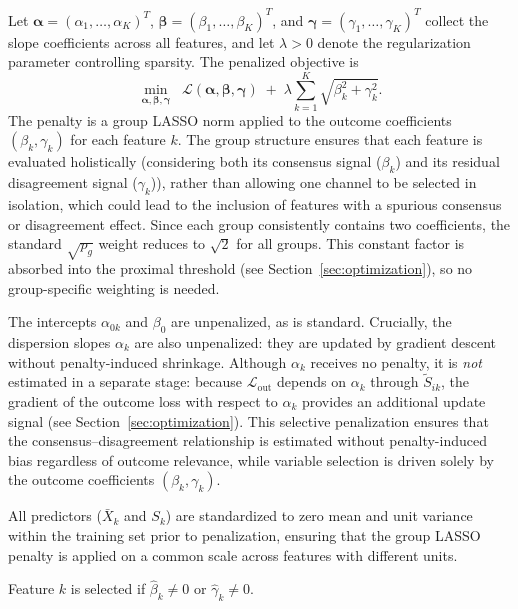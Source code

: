 \documentclass[referee,lineno,pdflatex,sn-vancouver-num]{sn-jnl}
\begin{document}
Let $\boldsymbol{\alpha} = (\alpha_1,\dots,\alpha_K)^T$, $\boldsymbol{\beta} = (\beta_1,\dots,\beta_K)^T$, and $\boldsymbol{\gamma} = (\gamma_1,\dots,\gamma_K)^T$ collect the slope coefficients across all features, and let $\lambda > 0$ denote the regularization parameter controlling sparsity.
The penalized objective is
\begin{equation}\label{eq:objective}
  \min_{\boldsymbol{\alpha}, \boldsymbol{\beta}, \boldsymbol{\gamma}} \;\;
  \mathcal{L}(\boldsymbol{\alpha}, \boldsymbol{\beta}, \boldsymbol{\gamma})
  \;+\; \lambda \sum_{k=1}^K \sqrt{\beta_k^2 + \gamma_k^2}.
\end{equation}
The penalty is a group LASSO norm applied to the outcome coefficients $(\beta_k, \gamma_k)$ for each feature $k$.
The group structure ensures that each feature is evaluated holistically (considering both its consensus signal ($\beta_k$) and its residual disagreement signal ($\gamma_k$)), rather than allowing one channel to be selected in isolation, which could lead to the inclusion of features with a spurious consensus or disagreement effect.
Since each group consistently contains two coefficients, the standard $\sqrt{p_g}$ weight reduces to $\sqrt{2}$ for all groups. This constant factor is absorbed into the proximal threshold (see Section~\ref{sec:optimization}), so no group-specific weighting is needed.

The intercepts $\alpha_{0k}$ and $\beta_0$ are unpenalized, as is standard.
Crucially, the dispersion slopes $\alpha_k$ are also unpenalized: they are updated by gradient descent without penalty-induced shrinkage.
Although $\alpha_k$ receives no penalty, it is \emph{not} estimated in a separate stage: because $\mathcal{L}_{\mathrm{out}}$ depends on $\alpha_k$ through $\tilde S_{ik}$, the gradient of the outcome loss with respect to $\alpha_k$ provides an additional update signal (see Section~\ref{sec:optimization}).
This selective penalization ensures that the consensus--disagreement relationship is estimated without penalty-induced bias regardless of outcome relevance, while variable selection is driven solely by the outcome coefficients $(\beta_k, \gamma_k)$.

All predictors ($\bar X_k$ and $S_k$) are standardized to zero mean and unit variance within the training set prior to penalization, ensuring that the group LASSO penalty is applied on a common scale across features with different units.

Feature $k$ is selected if $\hat\beta_k \neq 0$ or $\hat\gamma_k \neq 0$.
\end{document}
